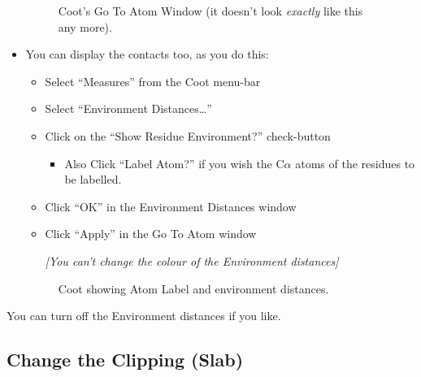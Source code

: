 \documentclass{article}
\begin{document}
\begin{itemize}
\begin{figure}[htbp]
  \begin{center}
    \leavevmode
    \epsfxsize 70mm
    \caption{Coot's Go To Atom Window (it doesn't look \emph{exactly} like this any more).}
    \label{fig:goto-atom}
  \end{center}
\end{figure}

\item You can display the contacts too, as you do this:

  \begin{itemize}
  \item Select \textsf{``Measures''} from the Coot menu-bar
  \item Select \textsf{``Environment Distances\ldots''}
  \item Click on the \textsf{``Show Residue Environment?''} check-button
    \begin{itemize}
    \item Also Click \textsf{``Label Atom?''} if you wish the
      C$\alpha$ atoms of the residues to be labelled.
    \end{itemize}
  \item Click \textsf{``OK''} in the Environment Distances window
  \item Click \textsf{``Apply''} in the Go To Atom window

    \emph{[You can't change the colour of the Environment distances]}
  \end{itemize}

  \begin{figure}[htbp]
    \begin{center}
      \leavevmode
      \epsfxsize 70mm
      \caption{Coot showing Atom Label and environment distances.}
      \label{fig:environment}
    \end{center}
  \end{figure}
\end{itemize}

You can turn off the Environment distances if you like.

\subsection{Change the Clipping (Slab)}
\end{document}
